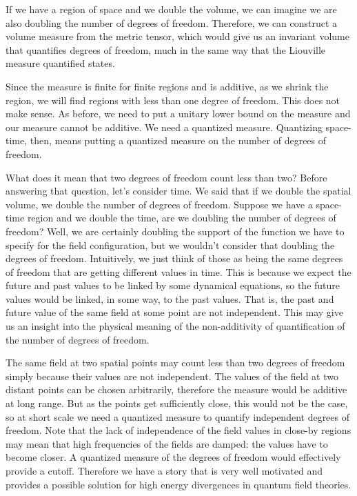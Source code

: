 \documentclass[entropy,article,submit,pdftex,moreauthors]{Definitions/mdpi}
\begin{document}
If we have a region of space and we double the volume, we can imagine we are also doubling the number of degrees of freedom. Therefore, we can construct a volume measure from the metric tensor, which would give us an invariant volume that quantifies degrees of freedom, much in the same way that the Liouville measure quantified states.

Since the measure is finite for finite regions and is additive, as we shrink the region, we will find regions with less than one degree of freedom. This does not make sense. As before, we need to put a unitary lower bound on the measure and our measure cannot be additive. We need a quantized measure. Quantizing space-time, then, means putting a quantized measure on the number of degrees of freedom.

What does it mean that two degrees of freedom count less than two? Before answering that question, let's consider time. We said that if we double the spatial volume, we double the number of degrees of freedom. Suppose we have a space-time region and we double the time, are we doubling the number of degrees of freedom? Well, we are certainly doubling the support of the function we have to specify for the field configuration, but we wouldn't consider that doubling the degrees of freedom. Intuitively, we just think of those as being the same degrees of freedom that are getting different values in time. This is because we expect the future and past values to be linked by some dynamical equations, so the future values would be linked, in some way, to the past values. That is, the past and future value of the same field at some point are not independent. This may give us an insight into the physical meaning of the non-additivity of quantification of the number of degrees of freedom.

The same field at two spatial points may count less than two degrees of freedom simply because their values are not independent. The values of the field at two distant points can be chosen arbitrarily, therefore the measure would be additive at long range. But as the points get sufficiently close, this would not be the case, so at short scale we need a quantized measure to quantify independent degrees of freedom. Note that the lack of independence of the field values in close-by regions may mean that high frequencies of the fields are damped: the values have to become closer. A quantized measure of the degrees of freedom would effectively provide a cutoff. Therefore we have a story that is very well motivated and provides a possible solution for high energy divergences in quantum field theories.
\end{document}
